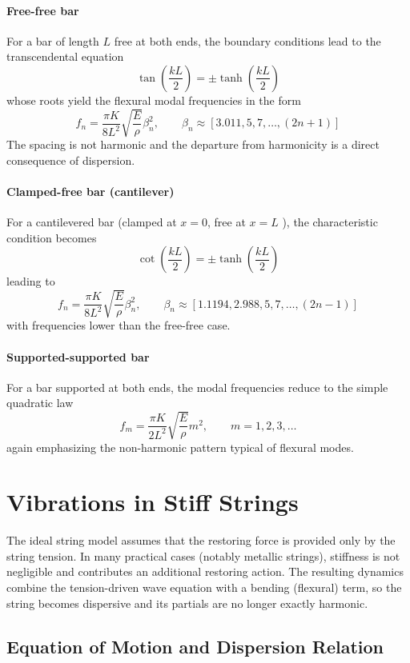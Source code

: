 \paragraph{Free-free bar} For a bar of length \( L \) free at both ends, the boundary conditions lead to the transcendental equation
\[
\tan\left(\frac{kL}{2}\right) = \pm\tanh\left(\frac{kL}{2}\right)
\]
whose roots yield the flexural modal frequencies in the form
\[
f_n = \frac{\pi K}{8L^2}\sqrt{\frac{E}{\rho}}
\beta_n^2,
\qquad
\beta_n\approx \left[3.011, 5, 7,\dots,(2n + 1)\right]
\]
The spacing is not harmonic and the departure from harmonicity is a direct consequence of dispersion.

\paragraph{Clamped-free bar (cantilever)} For a cantilevered bar (clamped at \( x = 0 \), free at \( x = L \) ), the characteristic condition becomes
\[
\cot\left(\frac{kL}{2}\right) = \pm\tanh\left(\frac{kL}{2}\right)
\]
leading to
\[
f_n = \frac{\pi K}{8L^2}\sqrt{\frac{E}{\rho}}
\beta_n^2,
\qquad
\beta_n\approx \left[1.1194, 2.988, 5, 7, \dots, (2n-1)\right]
\]
with frequencies lower than the free-free case. 

\paragraph{Supported-supported bar} For a bar supported at both ends, the modal frequencies reduce to the simple quadratic law
\[
f_m = \frac{\pi K}{2L^2}\sqrt{\frac{E}{\rho}}m^2,
\qquad
m = 1,2,3,\dots
\]
again emphasizing the non-harmonic pattern typical of flexural modes.

\section{Vibrations in Stiff Strings}

The ideal string model assumes that the restoring force is provided only by the string tension. In many practical cases (notably metallic strings), stiffness is not negligible and contributes an additional restoring action. The resulting dynamics combine the tension-driven wave equation with a bending (flexural) term, so the string becomes dispersive and its partials are no longer exactly harmonic.

\subsection{Equation of Motion and Dispersion Relation}

